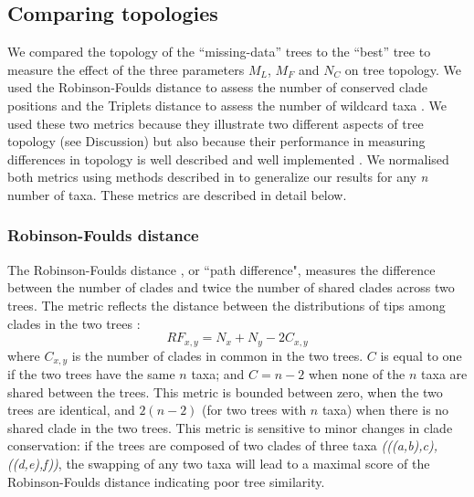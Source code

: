 
\subsection{Comparing topologies}
We compared the topology of the ``missing-data'' trees to the ``best'' tree to measure the effect of the three parameters $M_{L}$, $M_{F}$ and $N_{C}$ on tree topology.
We used the Robinson-Foulds distance \citep{RF1981} to assess the number of conserved clade positions and the Triplets distance \citep{dobson1975triplets} to assess the number of wildcard taxa \citep[i.e. taxa that frequently change position in different trees;][]{kearneyfragmentary2002}. We used these two metrics because they illustrate two different aspects of tree topology (see Discussion) but also because their performance in measuring differences in topology is well described \citep{Kuhner04112014} and well implemented \citep{Bogdanowicz2012}.
We normalised both metrics using methods described in \citet{Bogdanowicz2012} to generalize our results for any \textit{n} number of taxa.
These metrics are described in detail below.

\subsubsection*{Robinson-Foulds distance}
The Robinson-Foulds distance \citep{RF1981}, or ``path difference", measures the difference between the number of clades and twice the number of shared clades across two trees.
The metric reflects the distance between the distributions of tips among clades in the two trees \citep{RF1981}:
\begin{equation}
RF_{x,y} = N_{x} + N_{y} - 2C_{x,y}
\end{equation}
where $C_{x,y}$ is the number of clades in common in the two trees.
$C$ is equal to one if the two trees have the same $n$ taxa; and $C = n-2$ when none of the $n$ taxa are shared between the trees.
This metric is bounded between zero, when the two trees are identical, and $2(n-2)$ (for two trees with $n$ taxa) when there is no shared clade in the two trees.
This metric is sensitive to minor changes in clade conservation: if the trees are composed of two clades of three taxa \textit{(((a,b),c),((d,e),f))}, the swapping of any two taxa will lead to a maximal score of the Robinson-Foulds distance indicating poor tree similarity.

